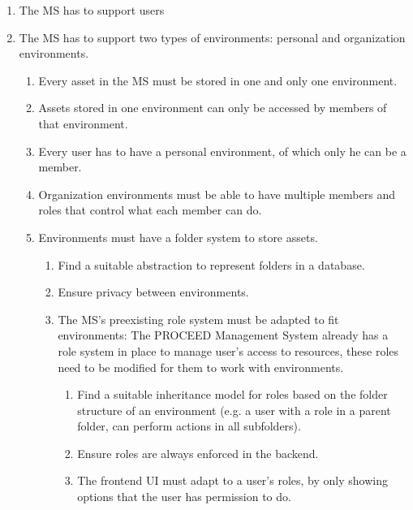 \begin{enumerate}
  \item The MS has to support users 

  \item The MS has to support two types of environments: personal and organization environments.
    \begin{enumerate}
      \item Every asset in the MS must be stored in one and only one environment.

      \item Assets stored in one environment can only be accessed by members of that
        environment.

      \item Every user has to have a personal environment, of which only he can be a member.

      \item Organization environments must be able to have multiple members and roles that control what each member can do.

      \item Environments must have a folder system to store assets.
        \begin{enumerate}
          \item Find a suitable abstraction to represent folders in a database.

          \item Ensure privacy between environments.


          \item The MS's preexisting role system must be adapted to fit environments:
            The PROCEED Management System already has a role system in place to manage user's access to resources, these roles need to be modified for them to work with environments.
            \begin{enumerate}
              \item Find a suitable inheritance model for roles based on the folder
                structure of an environment (e.g. a user with a role in a parent
                folder, can perform actions in all subfolders).
              \item Ensure roles are always enforced in the backend.
              \item The frontend UI must adapt to a user's roles, by only showing options that the user has permission to do.
            \end{enumerate}
        \end{enumerate}


\end{enumerate}
\end{enumerate}
